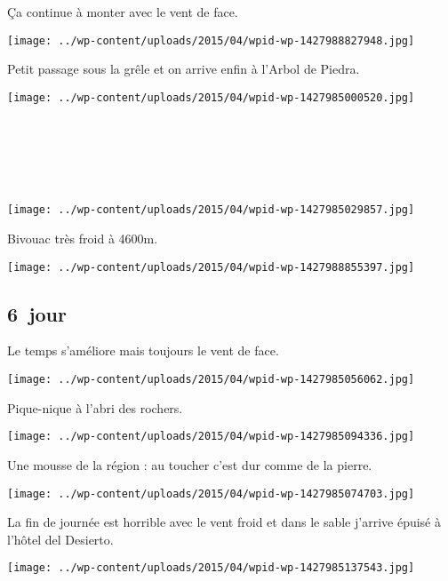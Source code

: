  Ça continue à monter avec le vent de face.
\begin{center} \texttt{[image: ../wp-content/uploads/2015/04/wpid-wp-1427988827948.jpg]} \end{center}

  Petit passage sous la grêle et on arrive enfin à l'Arbol de Piedra.
\begin{center} \texttt{[image: ../wp-content/uploads/2015/04/wpid-wp-1427985000520.jpg]} \end{center}
\vspace{-\topsep}

\pagebreak
\subsection*{~}
~
\begin{center} \texttt{[image: ../wp-content/uploads/2015/04/wpid-wp-1427985029857.jpg]} \end{center}

 Bivouac très froid à 4600m.
\begin{center} \texttt{[image: ../wp-content/uploads/2015/04/wpid-wp-1427988855397.jpg]} \end{center}
\vspace{-\topsep}

\pagebreak
 \subsection*{6\ieme\ jour} 
 Le temps s'améliore mais toujours le vent de face.
\begin{center} \texttt{[image: ../wp-content/uploads/2015/04/wpid-wp-1427985056062.jpg]} \end{center}

 Pique-nique à l'abri des rochers.
\begin{center} \texttt{[image: ../wp-content/uploads/2015/04/wpid-wp-1427985094336.jpg]} \end{center}
\vspace{-\topsep}

\pagebreak
 Une mousse de la région : au toucher c'est dur comme de la pierre.
\begin{center} \texttt{[image: ../wp-content/uploads/2015/04/wpid-wp-1427985074703.jpg]} \end{center}

 La fin de journée est horrible avec le vent froid et dans le sable j'arrive épuisé à l'hôtel del Desierto.
\begin{center} \texttt{[image: ../wp-content/uploads/2015/04/wpid-wp-1427985137543.jpg]} \end{center}

